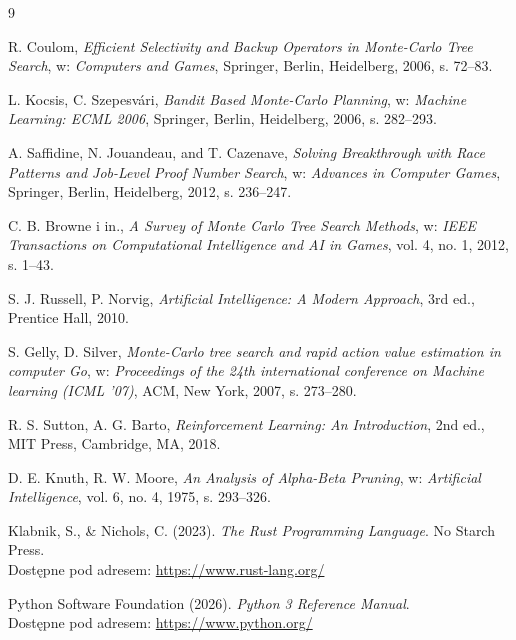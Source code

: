 \documentclass{article}
\begin{document}
\newpage
\begin{thebibliography}{9}

R. Coulom, 
\textit{Efficient Selectivity and Backup Operators in Monte-Carlo Tree Search}, 
w: \textit{Computers and Games}, 
Springer, Berlin, Heidelberg, 2006, s. 72--83.

L. Kocsis, C. Szepesv{\'a}ri, 
\textit{Bandit Based Monte-Carlo Planning}, 
w: \textit{Machine Learning: ECML 2006}, 
Springer, Berlin, Heidelberg, 2006, s. 282--293.

A. Saffidine, N. Jouandeau, and T. Cazenave, 
\textit{Solving Breakthrough with Race Patterns and Job-Level Proof Number Search}, 
w: \textit{Advances in Computer Games}, 
Springer, Berlin, Heidelberg, 2012, s. 236--247.

C. B. Browne i in., 
\textit{A Survey of Monte Carlo Tree Search Methods}, 
w: \textit{IEEE Transactions on Computational Intelligence and AI in Games}, 
vol. 4, no. 1, 2012, s. 1--43.

S. J. Russell, P. Norvig, 
\textit{Artificial Intelligence: A Modern Approach}, 
3rd ed., Prentice Hall, 2010.

S. Gelly, D. Silver, 
\textit{Monte-Carlo tree search and rapid action value estimation in computer Go}, 
w: \textit{Proceedings of the 24th international conference on Machine learning (ICML '07)}, 
ACM, New York, 2007, s. 273--280.

R. S. Sutton, A. G. Barto, 
\textit{Reinforcement Learning: An Introduction}, 
2nd ed., MIT Press, Cambridge, MA, 2018.

D. E. Knuth, R. W. Moore, 
\textit{An Analysis of Alpha-Beta Pruning}, 
w: \textit{Artificial Intelligence}, vol. 6, no. 4, 1975, s. 293--326.

Klabnik, S., \& Nichols, C. (2023). 
\textit{The Rust Programming Language}. 
No Starch Press. \\
Dostępne pod adresem: \url{https://www.rust-lang.org/}

Python Software Foundation (2026). 
\textit{Python 3 Reference Manual}. \\
Dostępne pod adresem: \url{https://www.python.org/}

\end{thebibliography}
\end{document}
